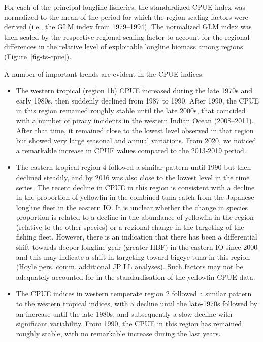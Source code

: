 \documentclass[
]{scrartcl}
\begin{document}
For each of the principal longline fisheries, the standardized CPUE
index was normalized to the mean of the period for which the region
scaling factors were derived (i.e., the GLM index from 1979--1994). The
normalized GLM index was then scaled by the respective regional scaling
factor to account for the regional differences in the relative level of
exploitable longline biomass among regions (Figure~\ref{fig-ts-cpue}).

A number of important trends are evident in the CPUE indices:

\begin{itemize}
\item
  The western tropical (region 1b) CPUE increased during the late 1970s
  and early 1980s, then suddenly declined from 1987 to 1990. After 1990,
  the CPUE in this region remained roughly stable until the late 2000s,
  that coincided with a number of piracy incidents in the western Indian
  Ocean (2008--2011). After that time, it remained close to the lowest
  level observed in that region but showed very large seasonal and
  annual variations. From 2020, we noticed a remarkable increase in CPUE
  values compared to the 2013-2019 period.
\item
  The eastern tropical region 4 followed a similar pattern until 1990
  but then declined steadily, and by 2016 was also close to the lowest
  level in the time series. The recent decline in CPUE in this region is
  consistent with a decline in the proportion of yellowfin in the
  combined tuna catch from the Japanese longline fleet in the eastern
  IO. It is unclear whether the change in species proportion is related
  to a decline in the abundance of yellowfin in the region (relative to
  the other species) or a regional change in the targeting of the
  fishing fleet. However, there is an indication that there has been a
  differential shift towards deeper longline gear (greater HBF) in the
  eastern IO since 2000 and this may indicate a shift in targeting
  toward bigeye tuna in this region (Hoyle pers. comm. additional JP LL
  analyses). Such factors may not be adequately accounted for in the
  standardisation of the yellowfin CPUE data.
\item
  The CPUE indices in western temperate region 2 followed a similar
  pattern to the western tropical indices, with a decline until the
  late-1970s followed by an increase until the late 1980s, and
  subsequently a slow decline with significant variability. From 1990,
  the CPUE in this region has remained roughly stable, with no
  remarkable increase during the last years.

\end{itemize}
\end{document}
